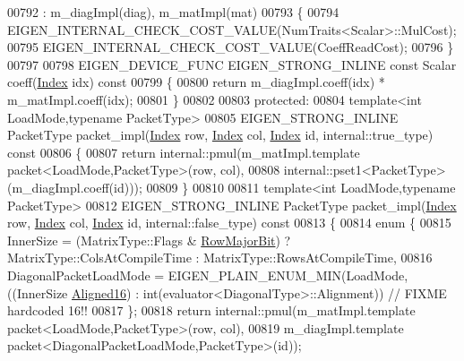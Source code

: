 \begin{DoxyCode}
00792     : m\_diagImpl(diag), m\_matImpl(mat)
00793   \{
00794     EIGEN\_INTERNAL\_CHECK\_COST\_VALUE(NumTraits<Scalar>::MulCost);
00795     EIGEN\_INTERNAL\_CHECK\_COST\_VALUE(CoeffReadCost);
00796   \}
00797   
00798   EIGEN\_DEVICE\_FUNC EIGEN\_STRONG\_INLINE \textcolor{keyword}{const} Scalar coeff(\hyperlink{namespace_eigen_a62e77e0933482dafde8fe197d9a2cfde}{Index} idx)\textcolor{keyword}{ const}
00799 \textcolor{keyword}{  }\{
00800     \textcolor{keywordflow}{return} m\_diagImpl.coeff(idx) * m\_matImpl.coeff(idx);
00801   \}
00802   
00803 \textcolor{keyword}{protected}:
00804   \textcolor{keyword}{template}<\textcolor{keywordtype}{int} LoadMode,\textcolor{keyword}{typename} PacketType>
00805   EIGEN\_STRONG\_INLINE PacketType packet\_impl(\hyperlink{namespace_eigen_a62e77e0933482dafde8fe197d9a2cfde}{Index} row, \hyperlink{namespace_eigen_a62e77e0933482dafde8fe197d9a2cfde}{Index} col, 
      \hyperlink{namespace_eigen_a62e77e0933482dafde8fe197d9a2cfde}{Index} \textcolor{keywordtype}{id}, internal::true\_type)\textcolor{keyword}{ const}
00806 \textcolor{keyword}{  }\{
00807     \textcolor{keywordflow}{return} internal::pmul(m\_matImpl.template packet<LoadMode,PacketType>(row, col),
00808                           internal::pset1<PacketType>(m\_diagImpl.coeff(\textcolor{keywordtype}{id})));
00809   \}
00810   
00811   \textcolor{keyword}{template}<\textcolor{keywordtype}{int} LoadMode,\textcolor{keyword}{typename} PacketType>
00812   EIGEN\_STRONG\_INLINE PacketType packet\_impl(\hyperlink{namespace_eigen_a62e77e0933482dafde8fe197d9a2cfde}{Index} row, \hyperlink{namespace_eigen_a62e77e0933482dafde8fe197d9a2cfde}{Index} col, 
      \hyperlink{namespace_eigen_a62e77e0933482dafde8fe197d9a2cfde}{Index} \textcolor{keywordtype}{id}, internal::false\_type)\textcolor{keyword}{ const}
00813 \textcolor{keyword}{  }\{
00814     \textcolor{keyword}{enum} \{
00815       InnerSize = (MatrixType::Flags & \hyperlink{group__flags_gae4f56c2a60bbe4bd2e44c5b19cbe8762}{RowMajorBit}) ? MatrixType::ColsAtCompileTime : 
      MatrixType::RowsAtCompileTime,
00816       DiagonalPacketLoadMode = EIGEN\_PLAIN\_ENUM\_MIN(LoadMode,((InnerSize%
      \hyperlink{group__enums_gga45fe06e29902b7a2773de05ba27b47a1af8e2bf74b04c02199f62c5e3c06dbfcc}{Aligned16}) : int(evaluator<DiagonalType>::Alignment)) \textcolor{comment}{// FIXME hardcoded 16!!}
00817     \};
00818     \textcolor{keywordflow}{return} internal::pmul(m\_matImpl.template packet<LoadMode,PacketType>(row, col),
00819                           m\_diagImpl.template packet<DiagonalPacketLoadMode,PacketType>(\textcolor{keywordtype}{id}));

\end{DoxyCode}
